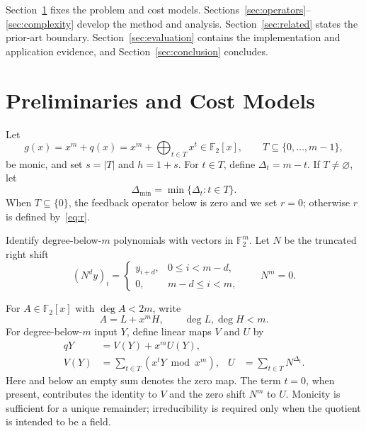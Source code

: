 \documentclass{mcom-l}
\numberwithin{equation}{section}
\theoremstyle{definition}
\theoremstyle{remark}
\newcommand{\Ftwo}{\mathbb{F}_2}
\newcommand{\poly}{\Ftwo[x]}
\newcommand{\Dmin}{\Delta_{\min}}
\begin{document}
Section~\ref{sec:preliminaries} fixes the problem and cost models.
Sections~\ref{sec:operators}--\ref{sec:complexity} develop
the method and analysis.  Section~\ref{sec:related} states the prior-art
boundary.  Section~\ref{sec:evaluation} contains the implementation and
application evidence, and Section~\ref{sec:conclusion} concludes.

\section{Preliminaries and Cost Models}
\label{sec:preliminaries}

Let
\begin{equation}
  g(x)=x^m+q(x)=x^m+\bigoplus_{t\in T}x^t\in\poly,
  \qquad T\subseteq\{0,\ldots,m-1\},
  \label{eq:modulus}
\end{equation}
be monic, and set $s=|T|$ and $h=1+s$.  For $t\in T$, define
$\Delta_t=m-t$.  If $T\ne\varnothing$, let
\begin{equation}
  \Dmin=\min\{\Delta_t:t\in T\}.
\end{equation}
When $T\subseteq\{0\}$, the feedback operator below is zero and we set
$r=0$; otherwise $r$ is defined by~\eqref{eq:r}.

Identify degree-below-$m$ polynomials with vectors in $\Ftwo^m$.  Let $N$ be
the truncated right shift
\begin{equation}
  (N^d y)_i=\begin{cases}y_{i+d},&0\le i<m-d,\\0,&m-d\le i<m,
  \end{cases}
  \qquad N^m=0.
\end{equation}

For $A\in\poly$ with $\deg A<2m$, write
\begin{equation}
  A=L+x^mH,
  \qquad \deg L,\deg H<m.
  \label{eq:low-high}
\end{equation}
For degree-below-$m$ input $Y$, define linear maps $V$ and $U$ by
\begin{align}
  qY&=V(Y)+x^mU(Y),\nonumber\\
  V(Y)&=\sum_{t\in T}(x^tY\bmod x^m),
  &U&=\sum_{t\in T}N^{\Delta_t}.
  \label{eq:UV}
\end{align}
Here and below an empty sum denotes the zero map.  The term $t=0$, when
present, contributes the identity to $V$ and the zero shift $N^m$ to $U$.
Monicity is sufficient for a unique remainder; irreducibility is required only
when the quotient is intended to be a field.
\end{document}
